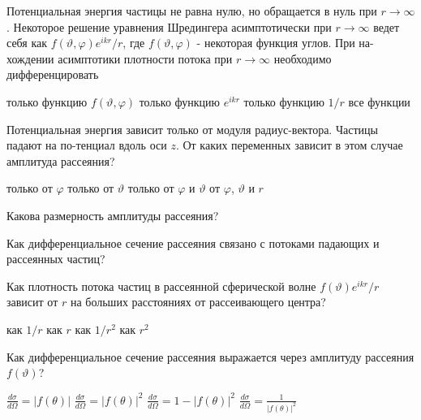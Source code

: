 \documentclass[11pt,a4paper]{exam}
\begin{document}
\begin{questions}
\question Потенциальная энергия частицы не равна нулю, но обращается в нуль при $r \to \infty $. Некоторое решение уравнения Шредингера асимптотически при $r \to \infty $ ведет себя как  $f(\vartheta ,\varphi ){e^{ikr}}/r$, где $f(\vartheta ,\varphi )$ - некоторая функция углов. При на-хождении асимптотики плотности потока при $r \to \infty $ необходимо дифференцировать
\begin{choices}
\choice только функцию $f(\vartheta ,\varphi )$      
\choice только функцию ${e^{ikr}}$
\choice только функцию $1/r$    
\choice все функции
\end{choices}

\question Потенциальная энергия зависит только от модуля радиус-вектора. Частицы падают на по-тенциал вдоль оси $z$. От каких переменных зависит в этом случае амплитуда рассеяния?
\begin{choices}
\choice только от $\varphi $  
\choice только от $\vartheta $   
\choice только от $\varphi $ и $\vartheta $   
\choice от $\varphi $, $\vartheta $ и $r$
\end{choices}

\question Какова размерность амплитуды рассеяния?
\begin{choices}
\choice       
\choice       
\choice       
\choice 
\end{choices}

\question Как дифференциальное сечение рассеяния связано с потоками падающих  и рассеянных  частиц?
\begin{choices}
\choice       
\choice    
\choice    
\choice 
\end{choices}

\question Как плотность потока частиц в рассеянной сферической волне $f(\vartheta ){e^{ikr}}/r$ зависит от $r$ на больших расстояниях от рассеивающего центра?
\begin{choices}
\choice как $1/r$    
\choice как $r$      
\choice как $1/{r^2}$      
\choice как ${r^2}$
\end{choices}

\question Как дифференциальное сечение рассеяния выражается через амплитуду рассеяния $f(\vartheta )$?
\begin{choices}
\choice $\frac{{d\sigma }}{{d\Omega }} = \left| {f(\theta )} \right|$  
\choice $\frac{{d\sigma }}{{d\Omega }} = {\left| {f(\theta )} \right|^2}$    
\choice $\frac{{d\sigma }}{{d\Omega }} = 1 - {\left| {f(\theta )} \right|^2}$      
\choice $\frac{{d\sigma }}{{d\Omega }} = \frac{1}{{{{\left| {f(\theta )} \right|}^2}}}$
\end{choices}


\end{questions}
\end{document}
